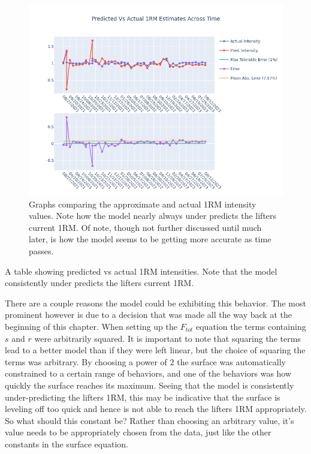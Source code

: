 \begin{figure}[htb]
    \centering
    \includegraphics[scale=0.55]{images/ch3/PredVsActual1RM.basic.png}
    \caption{Graphs comparing the approximate and actual 1RM intensity values. Note how the model nearly always under predicts the lifters current 1RM. Of note, though not further discussed until much later, is how the model seems to be getting more accurate as time passes.}
    \label{fig:ApproximateVsActual1RMIntensity}
\end{figure}
\begin{table}[p]
    \centering
	\caption{A table showing predicted vs actual 1RM intensities. Note that the model consistently under predicts the lifters current 1RM.}
	\label{tab:BasicSurface1RMEstimations}
\end{table}

There are a couple reasons the model could be exhibiting this behavior. The most prominent however is due to a decision that was made all the way back at the beginning of this chapter. When setting up the $F_{tot}$ equation the terms containing $s$ and $r$ were arbitrarily squared. It is important to note that squaring the terms lead to a better model than if they were left linear, but the choice of squaring the terms was arbitrary. By choosing a power of $2$ the surface was automatically constrained to a certain range of behaviors, and one of the behaviors was how quickly the surface reaches its maximum. Seeing that the model is consistently under-predicting the lifters 1RM, this may be indicative that the surface is leveling off too quick and hence is not able to reach the lifters 1RM appropriately. So what should this constant be? Rather than choosing an arbitrary value, it's value needs to be appropriately chosen from the data, just like the other constants in the surface equation.

